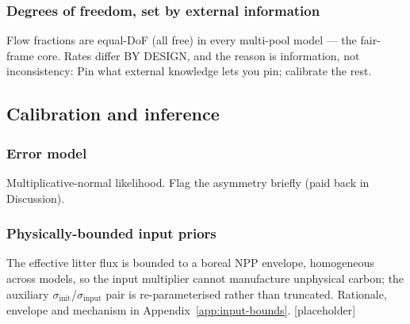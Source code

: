 \documentclass[11pt]{article}
\newif\ifstrat
\newcommand{\stratnote}[1]{\ifstrat{\color{red}#1}\fi}  %
\begin{document}
\subsubsection{Degrees of freedom, set by external information}
Flow fractions are equal-DoF (all free) in every multi-pool model --- the
fair-frame core. Rates differ BY DESIGN, and the reason is information, not
inconsistency:
Pin what external knowledge lets you pin; calibrate the rest.
\stratnote{[strand] This convention is also what makes the stratified extension
Yasso-only: with rates fixed, Yasso's stratifiable knobs are inputs + the
humus-formation fraction --- see the optional strand in the Outlook.}

\subsection{Calibration and inference}

\subsubsection{Error model}
Multiplicative-normal likelihood. Flag the asymmetry briefly (paid back in
Discussion).

\subsubsection{Physically-bounded input priors}
The effective litter flux is bounded to a boreal NPP envelope, homogeneous across
models, so the input multiplier cannot manufacture unphysical carbon; the
auxiliary $\sigma_{\mathrm{init}}$/$\sigma_{\mathrm{input}}$ pair is
re-parameterised rather than truncated. Rationale, envelope and mechanism in
Appendix~\ref{app:input-bounds}. [placeholder]
\end{document}

